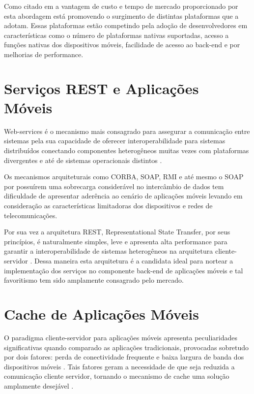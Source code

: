 \documentclass[
	article,			%
	11pt,				%
	oneside,			%
	a4paper,			%
	english,			%
	brazil,				%
	sumario=tradicional
]{abntex2}
\begin{document}
Como citado em \cite{shehab2014reducing} a vantagem de custo e tempo de mercado proporcionado por esta abordagem está promovendo o surgimento de distintas plataformas que a adotam. Essas plataformas estão competindo pela adoção de desenvolvedores em características como o número de plataformas nativas suportadas, acesso a funções nativas dos dispositivos móveis, facilidade de acesso ao \gls{back-end} e por melhorias de performance. 

\section{Serviços REST e Aplicações Móveis}
Web-services é o mecanismo mais consagrado para assegurar a comunicação entre sistemas pela sua capacidade de oferecer interoperabilidade para sistemas distribuídos conectando componentes heterogêneos muitas vezes com plataformas divergentes e até de sistemas operacionais distintos \cite{hamad2010performance}.

Os mecanismos arquiteturais como CORBA, SOAP, RMI e até mesmo o SOAP por possuírem uma sobrecarga considerável no intercâmbio de dados tem dificuldade de apresentar aderência ao cenário de aplicações móveis levando em consideração as características limitadoras dos dispositivos e redes de telecomunicações.

Por sua vez a arquitetura REST, Representational State Transfer, por seus princípios, é naturalmente simples, leve e apresenta alta performance para garantir a interoperabilidade de sistemas heterogêneos na arquitetura cliente-servidor \cite{hamad2010performance}. Dessa maneira esta arquitetura é a candidata ideal para nortear a implementação dos serviços no componente \gls{back-end} de aplicações móveis e tal favoritismo tem sido amplamente consagrado pelo mercado.

\section{Cache de Aplicações Móveis}

O paradigma cliente-servidor para aplicações móveis apresenta peculiaridades significativas quando comparado as aplicações tradicionais, provocadas sobretudo por dois fatores: perda de conectividade frequente e baixa largura de banda dos dispositivos móveis \cite{rathore2007overview}.
Tais fatores geram a necessidade de que seja reduzida a comunicação cliente servidor, tornando o mecanismo de cache uma solução amplamente desejável \cite{rathore2007overview}.
\end{document}
